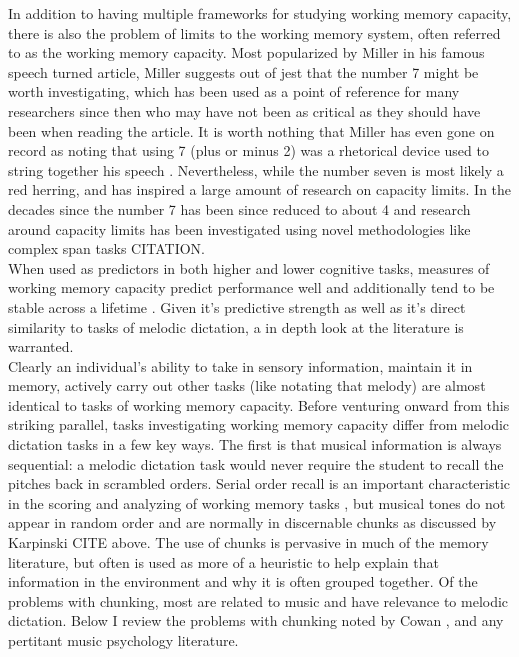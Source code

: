 \documentclass[]{book}
\theoremstyle{definition}
\theoremstyle{definition}
\theoremstyle{definition}
\theoremstyle{remark}
\begin{document}
In addition to having multiple frameworks for studying working memory
capacity, there is also the problem of limits to the working memory
system, often referred to as the working memory capacity. Most
popularized by Miller in his famous \citep{millerMagicalNumberSeven1956}
speech turned article, Miller suggests out of jest that the number 7
might be worth investigating, which has been used as a point of
reference for many researchers since then who may have not been as
critical as they should have been when reading the article. It is worth
nothing that Miller has even gone on record as noting that using 7 (plus
or minus 2) was a rhetorical device used to string together his speech
\citep{millerHistoryPsychologyAutobiography1989}. Nevertheless, while
the number seven is most likely a red herring, and has inspired a large
amount of research on capacity limits. In the decades since the number 7
has been since reduced to about 4 \citep{cowanMagicalMysteryFour2010}
and research around capacity limits has been investigated using novel
methodologies like complex span tasks CITATION.\\
When used as predictors in both higher and lower cognitive tasks,
measures of working memory capacity predict performance well and
additionally tend to be stable across a lifetime
\citep{unsworthAutomatedVersionOperation2005}. Given it's predictive
strength as well as it's direct similarity to tasks of melodic
dictation, a in depth look at the literature is warranted.\\
Clearly an individual's ability to take in sensory information, maintain
it in memory, actively carry out other tasks (like notating that melody)
are almost identical to tasks of working memory capacity. Before
venturing onward from this striking parallel, tasks investigating
working memory capacity differ from melodic dictation tasks in a few key
ways. The first is that musical information is always sequential: a
melodic dictation task would never require the student to recall the
pitches back in scrambled orders. Serial order recall is an important
characteristic in the scoring and analyzing of working memory tasks
\citep{conwayWorkingMemorySpan2005}, but musical tones do not appear in
random order and are normally in discernable chunks as discussed by
Karpinski CITE above. The use of chunks is pervasive in much of the
memory literature, but often is used as more of a heuristic to help
explain that information in the environment and why it is often grouped
together. Of the problems with chunking, most are related to music and
have relevance to melodic dictation. Below I review the problems with
chunking noted by Cowan \citep{cowanWorkingMemoryCapacity2005}, and any
pertitant music psychology literature.
\end{document}

